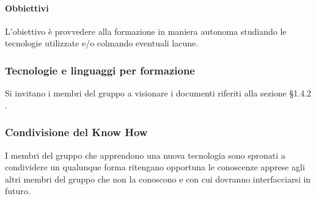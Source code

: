 			\paragraph{Obbiettivi}
				L'obiettivo è provvedere alla formazione in maniera autonoma studiando le tecnologie utilizzate e/o colmando eventuali lacune.
		\subsubsection{Tecnologie e linguaggi per formazione}
			Si invitano i membri del gruppo a visionare i documenti riferiti alla sezione §1.4.2 .
		\subsubsection{Condivisione del Know How}
			I membri del gruppo che apprendono una nuova tecnologia sono spronati a condividere un qualunque forma ritengano opportuna le conoscenze apprese agli altri membri del gruppo che non la conoscono e con cui dovranno interfacciarsi in futuro.




			
			
			
			
			
			
			
			
			
			
			
			
			
			
			
			
